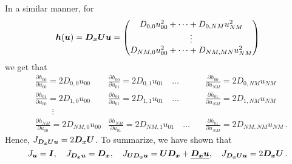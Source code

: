 In a similar manner, for
\[  
  \bm{h}(\bm{u}) = \bm{D_x} \bm{U}\bm{u} =
  \begin{pmatrix}
    D_{0,0}u_{00}^2 + \dots + D_{0,NM}u_{NM}^2
    \\
    \vdots 
    \\
    D_{NM,0} u_{00}^2 + \dots + D_{NM,MN}u_{NM}^2
  \end{pmatrix}
\]
we get that 
{\footnotesize
\begin{align*}
  &\frac{\partial h_{00}}{\partial u_{00}} = 2 D_{0,0}u_{00}
  &\frac{\partial h_{00}}{\partial u_{01}} = 2 D_{0,1}u_{01}
  \quad
  \dots 
  \quad 
  &\frac{\partial h_{00}}{\partial u_{NM}} = 2 D_{0,NM}u_{NM}
  \\
  &\frac{\partial h_{01}}{\partial u_{00}} = 2 D_{1,0}u_{00}
  &\frac{\partial h_{01}}{\partial u_{01}} = 2 D_{1,1}u_{01}
  \quad
  \dots 
  \quad 
  &\frac{\partial h_{01}}{\partial u_{NM}} = 2 D_{1,NM}u_{NM}
  \\
  & \quad \quad \vdots 
  \\
  &\frac{\partial h_{NM}}{\partial u_{00}} = 2 D_{NM,0}u_{00}
  &\frac{\partial h_{NM}}{\partial u_{01}} = 2 D_{NM,1}u_{01}
  \quad
  \dots 
  \quad 
  &\frac{\partial h_{01}}{\partial u_{NM}} = 2 D_{NM,NM}u_{NM}
  \, .
\end{align*}
}
Hence, $J_{\bm{D_x}\bm{U}\bm{u}} = 2 \bm{D_x} \bm{U}$.
To summarize, we have shown that
\begin{equation}
  J_{\un} = \In, \quad J_{\Dx \un } = \Dx, \quad 
  J_{\Un \Dx \un} = \Un \Dx + \diagn{\Dx\un}, \quad 
  J_{\Dx \Un \un} = 2 \Dx \Un
  \, .
  \label{eq:jacobians}
\end{equation}


